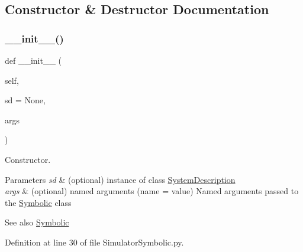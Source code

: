 \subsection{Constructor \& Destructor Documentation}
\mbox{\label{classSignalIntegrity_1_1SystemDescriptions_1_1SimulatorSymbolic_1_1SimulatorSymbolic_a72fa31992e716f60779f561f6cdbb4ce}} 
\subsubsection{\texorpdfstring{\+\_\+\+\_\+init\+\_\+\+\_\+()}{\_\_init\_\_()}}
{\footnotesize\ttfamily def \+\_\+\+\_\+init\+\_\+\+\_\+ (\begin{DoxyParamCaption}\item[{}]{self,  }\item[{}]{sd = {\ttfamily None},  }\item[{}]{args }\end{DoxyParamCaption})}



Constructor. 


\begin{DoxyParams}{Parameters}
{\em sd} & (optional) instance of class \hyperlink{namespaceSignalIntegrity_1_1SystemDescriptions_1_1SystemDescription}{System\+Description} \\
\hline
{\em args} & (optional) named arguments (name = value) Named arguments passed to the \hyperlink{namespaceSignalIntegrity_1_1SystemDescriptions_1_1Symbolic}{Symbolic} class \\
\hline
\end{DoxyParams}
\begin{DoxySeeAlso}{See also}
\hyperlink{namespaceSignalIntegrity_1_1SystemDescriptions_1_1Symbolic}{Symbolic} 
\end{DoxySeeAlso}


Definition at line 30 of file Simulator\+Symbolic.\+py.



